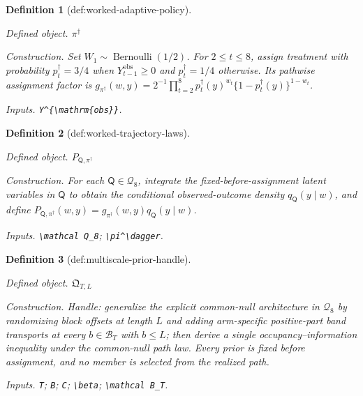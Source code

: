 \documentclass{article}
\newtheorem{definition}{Definition}
\begin{document}
\begin{definition}[def:worked-adaptive-policy]\label{def:worked-adaptive-policy}
\par\smallskip\noindent\emph{Defined object.} \(\pi^\dagger\)
\par\smallskip\noindent\emph{Construction.} Set \(W_1\sim\operatorname{Bernoulli}(1/2)\). For \(2\le t\le8\), assign treatment with probability \(p_t^\dagger=3/4\) when \(Y_{t-1}^{\mathrm{obs}}\ge0\) and \(p_t^\dagger=1/4\) otherwise. Its pathwise assignment factor is \(g_{\pi^\dagger}(w,y)=2^{-1}\prod_{t=2}^8p_t^\dagger(y)^{w_t}\{1-p_t^\dagger(y)\}^{1-w_t}\).
\par\smallskip\noindent\emph{Inputs.} \texttt{Y\textasciicircum{}\{\textbackslash{}\allowbreak{}mathrm\{obs\}\allowbreak{}\}\allowbreak{}}.
\end{definition}

\begin{definition}[def:worked-trajectory-laws]\label{def:worked-trajectory-laws}
\par\smallskip\noindent\emph{Defined object.} \(P_{\mathsf Q,\pi^\dagger}\)
\par\smallskip\noindent\emph{Construction.} For each \(\mathsf Q\in\mathcal Q_8\), integrate the fixed-before-assignment latent variables in \(\mathsf Q\) to obtain the conditional observed-outcome density \(q_{\mathsf Q}(y\mid w)\), and define \(P_{\mathsf Q,\pi^\dagger}(w,y)=g_{\pi^\dagger}(w,y)q_{\mathsf Q}(y\mid w)\).
\par\smallskip\noindent\emph{Inputs.} \texttt{\textbackslash{}\allowbreak{}mathcal Q\_\allowbreak{}8}; \texttt{\textbackslash{}\allowbreak{}pi\textasciicircum{}\textbackslash{}\allowbreak{}dagger}.
\end{definition}

\begin{definition}[def:multiscale-prior-handle]\label{def:multiscale-prior-handle}
\par\smallskip\noindent\emph{Defined object.} \(\mathfrak Q_{T,L}\)
\par\smallskip\noindent\emph{Construction.} Handle: generalize the explicit common-null architecture in \(\mathcal Q_8\) by randomizing block offsets at length \(L\) and adding arm-specific positive-part band transports at every \(b\in\mathcal B_T\) with \(b\le L\); then derive a single occupancy--information inequality under the common-null path law. Every prior is fixed before assignment, and no member is selected from the realized path.
\par\smallskip\noindent\emph{Inputs.} \texttt{T}; \texttt{B}; \texttt{C}; \texttt{\textbackslash{}\allowbreak{}beta}; \texttt{\textbackslash{}\allowbreak{}mathcal B\_\allowbreak{}T}.
\end{definition}
\end{document}

